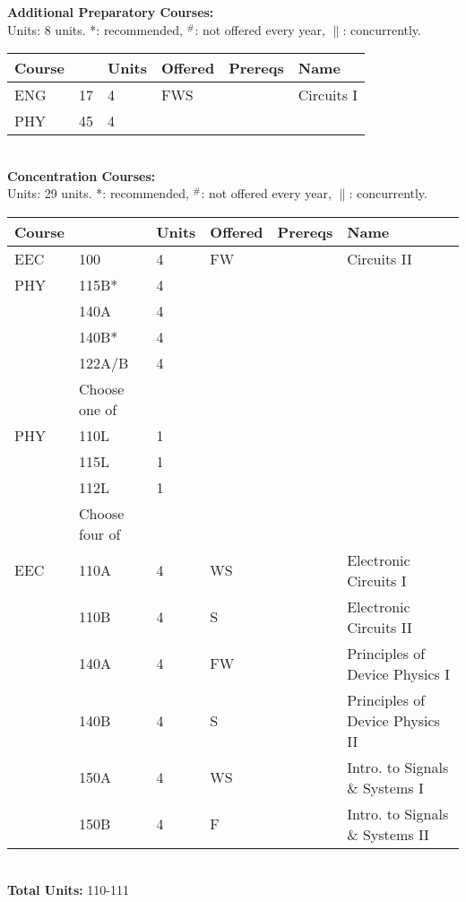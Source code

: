 \documentclass[12pt]{article}
\begin{document}
\newpage
{}
\vskip 0.25cm
\noindent
{\bf Additional Preparatory Courses:  }\\
Units:  8 units. *: recommended, $^\#$: not offered every year, $\parallel$: concurrently.\\
\begin{tabular}{|llllll|}
\hline
Course & & Units & Offered & Prereqs & Name \\
\hline
ENG & 17     & 4 & FWS & & Circuits I\\
PHY & 45     & 4 & & & \\
\hline
\end{tabular}\\
\vskip 0.25cm
\noindent
{\bf Concentration Courses:  }\\
Units:  29 units. *: recommended, $^\#$: not offered every year, $\parallel$: concurrently.\\
\begin{tabular}{|llllll|}
\hline
Course & & Units & Offered & Prereqs & Name \\
\hline
EEC & 100    & 4 & FW & & Circuits II\\
PHY & 115B*  & 4 & & & \\
    & 140A   & 4 & & & \\
    & 140B*  & 4 & & & \\
    & 122A/B & 4 & & & \\
\hline
\hline
    & Choose one of & & & & \\
\hline
PHY & 110L & 1 & & & \\
    & 115L & 1 & & & \\
    & 112L & 1 & & & \\
\hline
\hline
    & Choose four of & & & & \\
\hline
EEC & 110A  & 4 & WS & & Electronic Circuits I \\
    & 110B  & 4 & S  & & Electronic Circuits II\\
    & 140A  & 4 & FW & & Principles of Device Physics I\\
    & 140B  & 4 & S & & Principles of Device Physics II\\
    & 150A  & 4 & WS & & Intro. to Signals \& Systems I\\
    & 150B  & 4 & F & & Intro. to Signals \& Systems II\\
\hline
\end{tabular}\\
\vskip 0.25cm
\noindent
{\bf Total Units:} 110-111\\
\end{document}

